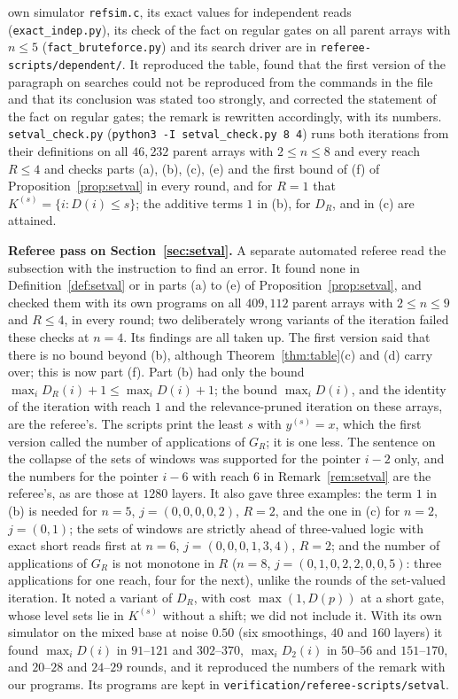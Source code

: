 \documentclass[11pt]{amsart}
\theoremstyle{definition}
\theoremstyle{remark}
\begin{document}
own simulator \texttt{refsim.c}, its exact values for independent reads
(\texttt{exact\_indep.py}), its check of the fact on regular gates on all parent arrays with
$n\le5$ (\texttt{fact\_bruteforce.py}) and its search driver are in
\texttt{referee-scripts/dependent/}. It reproduced the table, found that the first version of
the paragraph on searches could not be reproduced from the commands in the file and that its
conclusion was stated too strongly, and corrected the statement of the fact on regular gates;
the remark is rewritten accordingly, with its numbers. \texttt{setval\_check.py}
(\texttt{python3 -I setval\_check.py 8 4}) runs both iterations from their definitions on all
$46{,}232$ parent arrays with $2\le n\le8$ and every reach $R\le4$ and checks parts (a), (b), (c),
(e) and the first bound of (f) of Proposition~\ref{prop:setval} in every round, and for $R=1$ that
$K^{(s)}=\{i:D(i)\le s\}$; the additive terms $1$ in (b), for $D_R$, and in (c) are attained.

\medskip\noindent\textbf{Referee pass on Section~\ref{sec:setval}.} A separate automated referee
read the subsection with the instruction to find an error. It found none in
Definition~\ref{def:setval} or in parts (a) to (e) of Proposition~\ref{prop:setval}, and checked
them with its own programs on all $409{,}112$ parent arrays with $2\le n\le9$ and $R\le4$, in
every round; two deliberately wrong variants of the iteration failed these checks at $n=4$. Its
findings are all taken up. The first version said that there is no bound beyond (b), although
Theorem~\ref{thm:table}(c) and (d) carry over; this is now part (f). Part (b) had only the bound
$\max_iD_R(i)+1\le\max_iD(i)+1$; the bound $\max_iD(i)$, and the identity of the iteration with
reach $1$ and the relevance-pruned iteration on these arrays, are the referee's. The scripts
print the least $s$ with $y^{(s)}=x$, which the first version called the number of applications
of $G_R$; it is one less. The sentence on the collapse of the sets of windows was supported for
the pointer $i-2$ only, and the numbers for the pointer $i-6$ with reach $6$ in
Remark~\ref{rem:setval} are the referee's, as are those at $1280$ layers. It also gave three
examples: the term $1$ in (b) is needed for $n=5$, $j=(0,0,0,0,2)$, $R=2$, and the one in (c) for
$n=2$, $j=(0,1)$; the sets of windows are strictly ahead of three-valued logic with exact short
reads first at $n=6$, $j=(0,0,0,1,3,4)$, $R=2$; and the number of applications of $G_R$ is not
monotone in $R$ ($n=8$, $j=(0,1,0,2,2,0,0,5)$: three applications for one reach, four for the
next), unlike the rounds of the set-valued iteration. It noted a variant of $D_R$, with cost
$\max(1,D(p))$ at a short gate, whose level sets lie in $K^{(s)}$ without a shift; we did not
include it. With its own simulator on the mixed base at noise $0.50$ (six smoothings, $40$ and
$160$ layers) it found $\max_iD(i)$ in $91$--$121$ and $302$--$370$, $\max_iD_2(i)$ in $50$--$56$
and $151$--$170$, and $20$--$28$ and $24$--$29$ rounds, and it reproduced the numbers of the
remark with our programs. Its programs are kept in \texttt{verification/referee-scripts/setval}.
\end{document}
